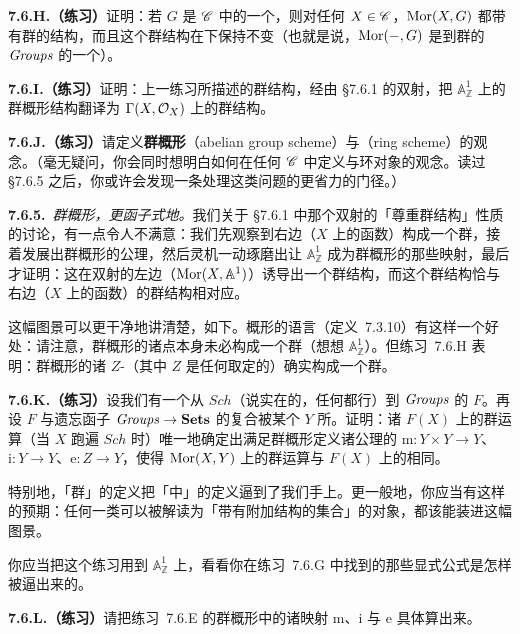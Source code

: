 \textbf{7.6.H.（练习）}\quad 证明：若 $G$ 是\trCategory{} $\mathscr{C}$ 中的一个\trGroupObject{}，则对任何 $X\in\mathscr{C}$，$\operatorname{Mor}(X,G)$ 都带有群的结构，而且这个群结构在\trPullback{}下保持不变（也就是说，$\operatorname{Mor}(-,G)$ 是到群的\trCategory{} $\mathit{Groups}$ 的一个\trContravariantFunctor）。

\textbf{7.6.I.（练习）}\quad 证明：上一练习所描述的群结构，经由 \S7.6.1 的双射，把 $\mathbb{A}^1_{\mathbb{Z}}$ 上的群概形结构翻译为 $\Gamma(X,\mathcal{O}_X)$ 上的群结构。

\textbf{7.6.J.（练习）}\quad 请定义\textbf{\trAbelian{}群概形}（abelian group scheme）与\textbf{\trRingScheme{}}（ring scheme）的观念。（毫无疑问，你会同时想明白如何在任何\trCategory{} $\mathscr{C}$ 中定义\trAbelian{}\trGroupObject{}与环对象的观念。读过 \S7.6.5 之后，你或许会发现一条处理这类问题的更省力的门径。）

\textbf{7.6.5.}\ \emph{群概形，更函子式地。}\quad 我们关于 \S7.6.1 中那个双射的「尊重群结构」性质的讨论，有一点令人不满意：我们先观察到右边（$X$ 上的函数）构成一个群，接着发展出群概形的公理，然后灵机一动琢磨出让 $\mathbb{A}^1_{\mathbb{Z}}$ 成为群概形的那些映射，最后才证明：这在双射的左边（$\operatorname{Mor}(X,\mathbb{A}^1)$）诱导出一个群结构，而这个群结构恰与右边（$X$ 上的函数）的群结构相对应。

这幅图景可以更干净地讲清楚，如下。概形\trValuedPoint{}的语言（定义~7.3.10）有这样一个好处：请注意，群概形的诸点本身未必构成一个群（想想 $\mathbb{A}^1_{\mathbb{Z}}$）。但\mbox{练习~7.6.H} 表明：群概形的诸 $Z$-\trValuedPoint（其中 $Z$ 是任何取定的\trScheme）确实构成一个群。

\textbf{7.6.K.（练习）}\quad 设我们有一个从 $\mathit{Sch}$（说实在的，任何\trCategory{}都行）到 $\mathit{Groups}$ 的\trContravariantFunctor{} $F$。再设 $F$ 与遗忘函子 $\mathit{Groups}\to\mathbf{Sets}$ 的复合被某个\trObject{} $Y$ 所\trRepresentation。证明：诸 $F(X)$ 上的群运算（当 $X$ 跑遍 $\mathit{Sch}$ 时）唯一地确定出满足群概形定义诸公理的 $\mathrm{m}\colon Y\times Y\to Y$、$\mathrm{i}\colon Y\to Y$、$\mathrm{e}\colon Z\to Y$，使得 $\operatorname{Mor}(X,Y)$ 上的群运算与 $F(X)$ 上的相同。

特别地，「群」的定义把「\trCategory{}中\trGroupObject{}」的定义逼到了我们手上。更一般地，你应当有这样的预期：任何一类可以被解读为「带有附加结构的集合」的对象，都该能装进这幅图景。

你应当把这个练习用到 $\mathbb{A}^1_{\mathbb{Z}}$ 上，看看你在\mbox{练习~7.6.G} 中找到的那些显式公式是怎样被逼出来的。

\textbf{7.6.L.（练习）}\quad 请把\mbox{练习~7.6.E} 的群概形中的诸映射 $\mathrm{m}$、$\mathrm{i}$ 与 $\mathrm{e}$ 具体算出来。

